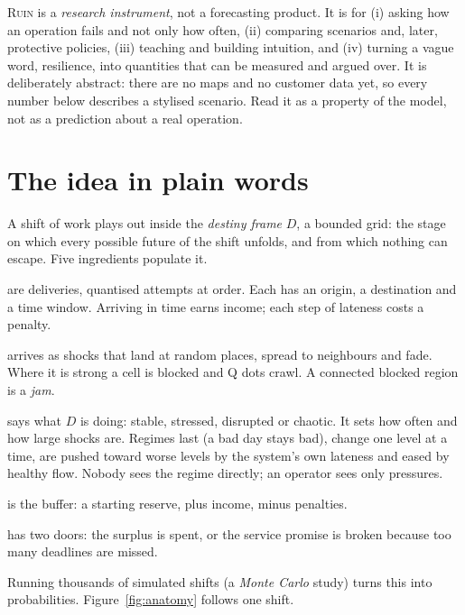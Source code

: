 \documentclass[10pt,twocolumn,a4paper]{article}
\newcommand{\ruin}{\textsc{Ruin}}
\begin{document}
\ruin{} is a \emph{research instrument}, not a forecasting product. It is for (i) asking how an operation fails and not only how often, (ii) comparing scenarios and, later, protective policies, (iii) teaching and building intuition, and (iv) turning a vague word, resilience, into quantities that can be measured and argued over. It is deliberately abstract: there are no maps and no customer data yet, so every number below describes a stylised scenario. Read it as a property of the model, not as a prediction about a real operation.

\section{The idea in plain words}
A shift of work plays out inside the \emph{destiny frame} $D$, a bounded grid: the stage on which every possible future of the shift unfolds, and from which nothing can escape. Five ingredients populate it.
\begin{description}[leftmargin=0pt,labelsep=0.4em,itemsep=1pt,parsep=0pt,topsep=2pt]
\item[Q dots] are deliveries, quantised attempts at order. Each has an origin, a destination and a time window. Arriving in time earns income; each step of lateness costs a penalty.
\item[Disruption] arrives as shocks that land at random places, spread to neighbours and fade. Where it is strong a cell is blocked and Q dots crawl. A connected blocked region is a \emph{jam}.
\item[A hidden regime] says what $D$ is doing: stable, stressed, disrupted or chaotic. It sets how often and how large shocks are. Regimes last (a bad day stays bad), change one level at a time, are pushed toward worse levels by the system's own lateness and eased by healthy flow. Nobody sees the regime directly; an operator sees only pressures.
\item[Surplus] is the buffer: a starting reserve, plus income, minus penalties.
\item[Ruin] has two doors: the surplus is spent, or the service promise is broken because too many deadlines are missed.
\end{description}
Running thousands of simulated shifts (a \emph{Monte Carlo} study) turns this into probabilities. Figure~\ref{fig:anatomy} follows one shift.
\end{document}
